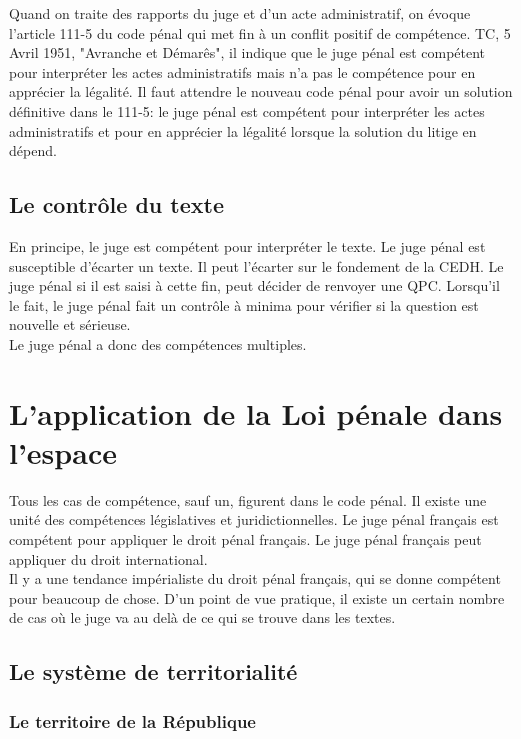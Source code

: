 \documentclass[10pt, a4paper, openany]{book}
\begin{document}
Quand on traite des rapports du juge et d'un acte administratif, on évoque l'article 111-5 du code pénal qui met fin à un conflit positif de compétence. TC, 5 Avril 1951, "Avranche et Démarês", il indique que le juge pénal est compétent pour interpréter les actes administratifs mais n'a pas le compétence pour en apprécier la légalité. Il faut attendre le nouveau code pénal pour avoir un solution définitive dans le 111-5: le juge pénal est compétent pour interpréter les actes administratifs et pour en apprécier la légalité lorsque la solution du litige en dépend.

\subsection{Le contrôle du texte}

En principe, le juge est compétent pour interpréter le texte. Le juge pénal est susceptible d'écarter un texte. Il peut l'écarter sur le fondement de la CEDH. Le juge pénal si il est saisi à cette fin, peut décider de renvoyer une QPC. Lorsqu'il le fait, le juge pénal fait un contrôle à minima pour vérifier si la question est nouvelle et sérieuse. \\
Le juge pénal a donc des compétences multiples.

\section{L'application de la Loi pénale dans l'espace}

Tous les cas de compétence, sauf un, figurent dans le code pénal. Il existe une unité des compétences législatives et juridictionnelles. Le juge pénal français est compétent pour appliquer le droit pénal français. Le juge pénal français peut appliquer du droit international. \\
Il y a une tendance impérialiste du droit pénal français, qui se donne compétent pour beaucoup de chose. D'un point de vue pratique, il existe un certain nombre de cas où le juge va au delà de ce qui se trouve dans les textes.

\subsection{Le système de territorialité}

\subsubsection{Le territoire de la République}
\end{document}
